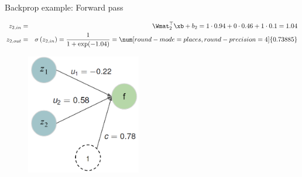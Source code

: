 \begin{vbframe}{Backprop example: Forward pass}
  \begin{figure}
    \centering
  \end{figure}
\vspace*{-0.5cm}
  \begin{footnotesize}
    \begin{eqnarray*}
    z_{2,in} &=& \Wmat_2^\top \xb + b_2 = 1 \cdot 0.94 + 0 \cdot 0.46 + 1 \cdot 0.1 = 1.04 \\
    z_{2,out} &=& \sigma\left(z_{2,in}\right) = \frac{1}{1+\exp(-1.04)} = \num[round-mode=places,round-precision=4]{0.73885}
    \end{eqnarray*}
  \end{footnotesize}
\framebreak

  \begin{figure}
    \centering
      \includegraphics[width=5cm]{figure/forwardprop4b_new.png}
  \end{figure}


\end{vbframe}
